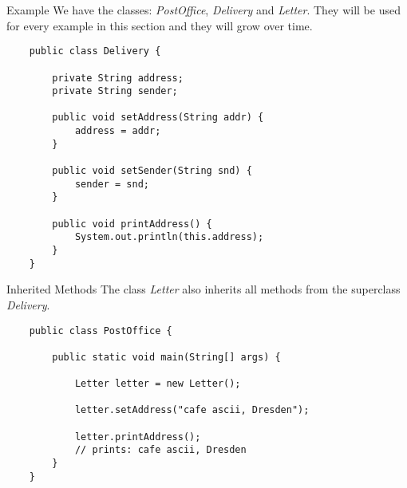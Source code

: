 \begin{frame}[fragile]{Example}
	We have the classes: \emph{PostOffice}, \emph{Delivery} and \emph{Letter}.
	They will be used for every example in this section and they will grow over time.
	\begin{lstlisting}
	public class Delivery {
	
	    private String address;
	    private String sender;
	    
	    public void setAddress(String addr) {
			address = addr;
	    }
	    
	    public void setSender(String snd) {
			sender = snd;
	    }
	    
	    public void printAddress() {
	        System.out.println(this.address);
	    }
	}
	\end{lstlisting}
\end{frame}

\begin{frame}[fragile]{Inherited Methods}
	The class \emph{Letter} also inherits all methods from the superclass \emph{Delivery}.
	\begin{lstlisting}
	public class PostOffice {
	
	    public static void main(String[] args) {
	    
	        Letter letter = new Letter();
	        
	        letter.setAddress("cafe ascii, Dresden");
	        
	        letter.printAddress();
	        // prints: cafe ascii, Dresden
	    }	
	}
	\end{lstlisting}
\end{frame}

